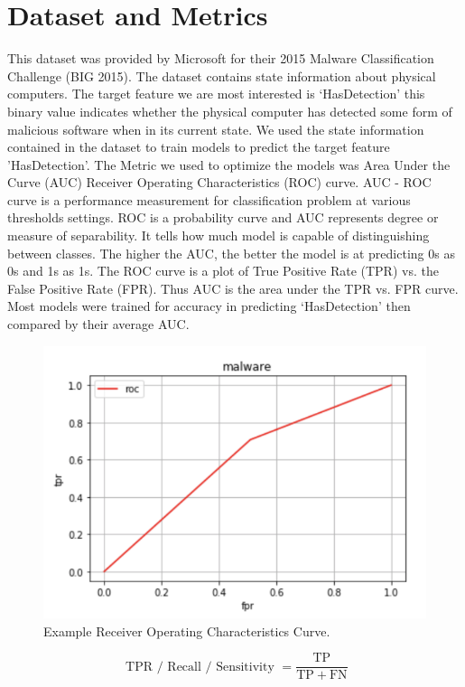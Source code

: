 \documentclass[sigconf]{acmart}
\begin{document}
\section{Dataset and Metrics}
This dataset was provided by Microsoft for their 2015 Malware Classification Challenge (BIG 2015). The dataset contains state information about physical computers. The target feature we are most interested is `HasDetection' this binary value indicates whether the physical computer has detected some form of malicious software when in its current state. We used the state information contained in the dataset to train models to predict the target feature 'HasDetection'. The Metric we used to optimize the models was Area Under the Curve (AUC) Receiver Operating Characteristics (ROC) curve. AUC - ROC curve is a performance measurement for classification problem at various thresholds settings. ROC is a probability curve and AUC represents degree or measure of separability. It tells how much model is capable of distinguishing between classes. The higher the AUC, the better the model is at predicting 0s as 0s and 1s as 1s. \cite{AUC:2018} The ROC curve is a plot of True Positive Rate (TPR) vs. the False Positive Rate (FPR). Thus AUC is the area under the TPR vs. FPR curve. Most models were trained for accuracy in predicting `HasDetection' then compared by their average AUC.

 \begin{figure}
  \includegraphics[width=\linewidth]{example-ROC.PNG}
  \caption{Example Receiver Operating Characteristics Curve.}
  \label{fig:roc}
\end{figure}

\begin{equation}
\text { TPR / Recall / Sensitivity }=\frac{\text { TP }}{\mathrm{TP}+\mathrm{FN}}
\end{equation}
\end{document}
